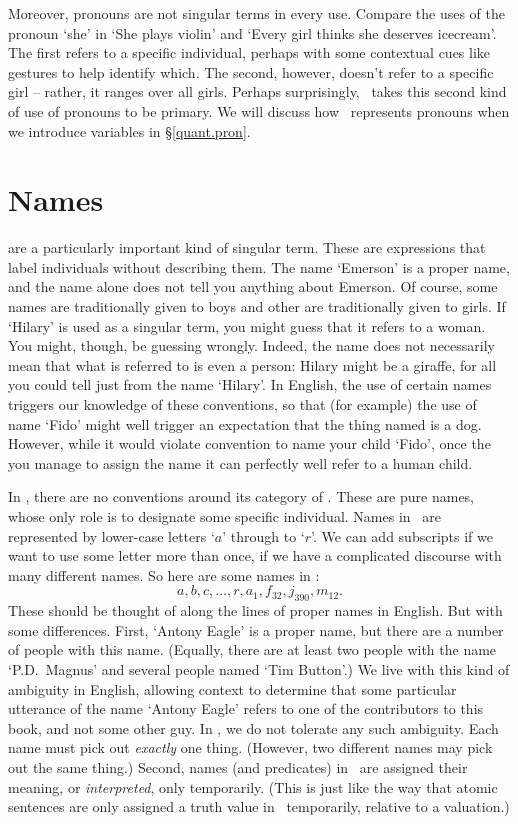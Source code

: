 Moreover, pronouns are not singular terms in every use. Compare the uses of the pronoun `she' in `She plays violin' and `Every girl thinks she deserves icecream'. The first refers to a specific individual, perhaps with some contextual cues like gestures to help identify which. The second, however, doesn't refer to a specific girl – rather, it ranges over all girls. Perhaps surprisingly, \FOL\ takes this second kind of use of pronouns to be primary. We will discuss how \FOL\ represents pronouns when we introduce variables in §\ref{quant.pron}.


\section{Names}\label{s:names}

 are a particularly important kind of singular term. These are expressions that label individuals without describing them. The name `Emerson' is a proper name, and the name alone does not tell you anything about Emerson. Of course, some names are traditionally given to boys and other are traditionally given to girls. If `Hilary' is used as a singular term, you might guess that it refers to a woman. You might, though, be guessing wrongly. Indeed, the name does not necessarily mean that what is referred to is even a person: Hilary might be a giraffe, for all you could tell just from the name `Hilary'. In English, the use of certain names triggers our knowledge of these conventions, so that (for example) the use of name `Fido' might well trigger an expectation that the thing named is a dog. However, while it would violate convention to name your child `Fido', once the you manage to assign the name it can perfectly well refer to a human child.  

In \FOL, there are no conventions around its category of . These are pure names, whose only role is to designate some specific individual. Names in \FOL\ are represented by lower-case letters `$a$' through to `$r$'. We can add subscripts if we want to use some letter more than once, if we have a complicated discourse with many different names. So here are some names in \FOL:
	\[a,b,c,…, r, a_{1}, f_{32}, j_{390}, m_{12}.\]
These should be thought of along the lines of proper names in English. But with some differences. First, `Antony Eagle' is a proper name, but there are a number of people with this name. (Equally, there are at least two people with the name `P.D.\ Magnus' and several people named `Tim Button'.) We live with this kind of ambiguity in English, allowing context to determine that some particular utterance of the name `Antony Eagle' refers to one of the contributors to this book, and not some other guy. In \FOL, we do not tolerate any such ambiguity. Each name must pick out \emph{exactly} one thing. (However, two different names may pick out the same thing.)  Second, names (and predicates) in \FOL\ are assigned their meaning, or \emph{interpreted}, only temporarily. (This is just like the way that atomic sentences are only assigned a truth value in \TFL\ temporarily, relative to a valuation.)

